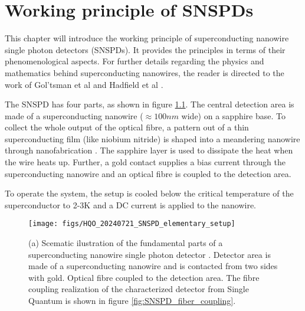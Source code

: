 \graphicspath{{/Users/maxim.re/Studium/Physik B.Sc./Semester_8_SS24/Proseminar/Figs Single Photon Detection/}}

\chapter{Working principle of SNSPDs}
\label{sec:SNSPD_working_principle}
This chapter will introduce the working principle of superconducting nanowire single photon detectors (SNSPDs).
It provides the principles in terms of their phenomenological aspects.
For further details regarding the physics and mathematics behind superconducting nanowires, the reader is directed
to the work of Gol’tsman et al \cite{goltsman-2001} and Hadfield et al \cite{natarajan-2012}.

The SNSPD has four parts, as shown in figure \ref{fig:SNSPD_rough_structure}.
The central detection area is made of a superconducting nanowire ($\approx 100nm$ wide) on a sapphire base.
To collect the whole output of the optical fibre, a pattern out of a
thin superconducting film (like niobium nitride) is shaped into a meandering nanowire through nanofabrication \cite{single-quantum-2022}.
The sapphire layer is used to dissipate the heat when the wire heats up.
Further, a gold contact supplies a bias current through the superconducting nanowire and an optical fibre is coupled to the detection area.

To operate the system, the setup is cooled below the critical temperature of the superconductor to
2-3K and a DC current is applied to the nanowire.

\begin{figure}[hhh]
    \centering
    \texttt{[image: figs/HQO\_20240721\_SNSPD\_elementary\_setup]}
    \caption{(a) Scematic ilustration of the fundamental parts of a superconducting nanowire single photon detector \cite{steudle-2012}.
    Detector area is made of a superconducting nanowire and is contacted from two sides with gold.
    Optical fibre coupled to the detection area.
    The fibre coupling realization of the characterized detector from Single Quantum is shown in figure \ref{fig:SNSPD_fiber_coupling}.}
    \label{fig:SNSPD_rough_structure}
\end{figure}

